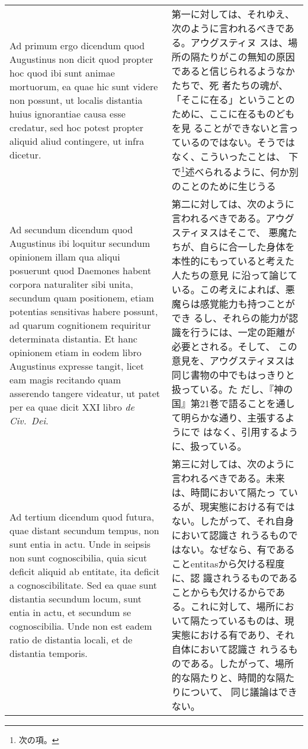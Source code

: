\documentclass[10pt]{jsarticle} %
\begin{document}
\begin{longtable}{p{21em}p{21em}}
\\


{\sc Ad primum ergo dicendum} quod Augustinus non dicit quod propter
hoc quod ibi sunt animae mortuorum, ea quae hic sunt videre non
possunt, ut localis distantia huius ignorantiae causa esse credatur,
sed hoc potest propter aliquid aliud contingere, ut infra dicetur.


&

第一に対しては、それゆえ、次のように言われるべきである。アウグスティヌ
スは、場所の隔たりがこの無知の原因であると信じられるようなかたちで、死
者たちの魂が、「そこに在る」ということのために、ここに在るものどもを見
ることができないと言っているのではない。そうではなく、こういったことは、
下で\footnote{次の項。}述べられるように、何か別のことのために生じうる

\\



{\sc Ad secundum dicendum} quod Augustinus ibi loquitur secundum
opinionem illam qua aliqui posuerunt quod Daemones habent corpora
naturaliter sibi unita, secundum quam positionem, etiam potentias
sensitivas habere possunt, ad quarum cognitionem requiritur
determinata distantia. Et hanc opinionem etiam in eodem libro
Augustinus expresse tangit, licet eam magis recitando quam asserendo
tangere videatur, ut patet per ea quae dicit XXI libro {\it de
Civ.~Dei}.

&


第二に対しては、次のように言われるべきである。アウグスティヌスはそこで、
悪魔たちが、自らに合一した身体を本性的にもっていると考えた人たちの意見
に沿って論じている。この考えによれば、悪魔らは感覚能力も持つことができ
るし、それらの能力が認識を行うには、一定の距離が必要とされる。そして、
この意見を、アウグスティヌスは同じ書物の中でもはっきりと扱っている。た
だし、『神の国』第21巻で語ることを通して明らかな通り、主張するようにで
はなく、引用するように、扱っている。


\\


{\sc Ad tertium dicendum} quod futura, quae distant secundum tempus,
non sunt entia in actu. Unde in seipsis non sunt cognoscibilia, quia
sicut deficit aliquid ab entitate, ita deficit a cognoscibilitate. Sed
ea quae sunt distantia secundum locum, sunt entia in actu, et secundum
se cognoscibilia. Unde non est eadem ratio de distantia locali, et de
distantia temporis.


&

第三に対しては、次のように言われるべきである。未来は、時間において隔たっ
ているが、現実態における有ではない。したがって、それ自身において認識さ
れうるものではない。なぜなら、有であることentitasから欠ける程度に、認
識されうるものであることからも欠けるからである。これに対して、場所にお
いて隔たっているものは、現実態における有であり、それ自体において認識さ
れうるものである。したがって、場所的な隔たりと、時間的な隔たりについて、
同じ議論はできない。



\end{longtable}
\end{document}
